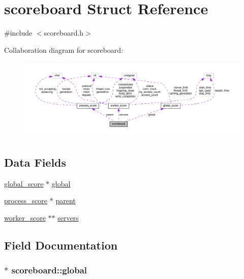 \hypertarget{structscoreboard}{}\section{scoreboard Struct Reference}
\label{structscoreboard}


{\ttfamily \#include $<$scoreboard.\+h$>$}



Collaboration diagram for scoreboard\+:
\nopagebreak
\begin{figure}[H]
\begin{center}
\leavevmode
\includegraphics[width=350pt]{structscoreboard__coll__graph}
\end{center}
\end{figure}
\subsection*{Data Fields}
\begin{DoxyCompactItemize}
\item 
\hyperlink{structglobal__score}{global\+\_\+score} $\ast$ \hyperlink{structscoreboard_adf777c5f1639e4d91bcf1a21bdc573ae}{global}
\item 
\hyperlink{structprocess__score}{process\+\_\+score} $\ast$ \hyperlink{structscoreboard_aa6f6cac3fd4d9881efaf5a2e0b0a98c7}{parent}
\item 
\hyperlink{structworker__score}{worker\+\_\+score} $\ast$$\ast$ \hyperlink{structscoreboard_aa37676240ced7c7542111b26d040e4c0}{servers}
\end{DoxyCompactItemize}


\subsection{Field Documentation}
\subsubsection[{\texorpdfstring{global}{global}}]{$\ast$ scoreboard\+::global}\hypertarget{structscoreboard_adf777c5f1639e4d91bcf1a21bdc573ae}{}\label{structscoreboard_adf777c5f1639e4d91bcf1a21bdc573ae}

